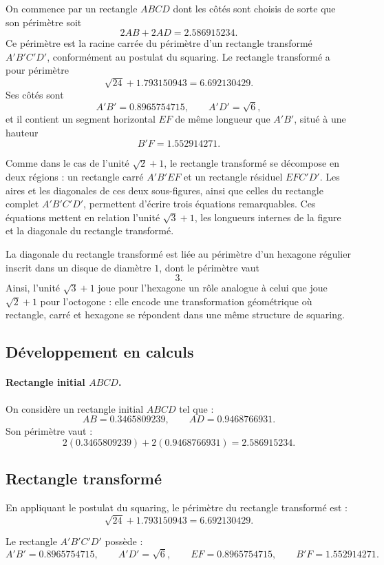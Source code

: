 \documentclass[12pt,a4paper]{article}
\begin{document}
On commence par un rectangle $ABCD$ dont les côtés sont choisis de sorte que son périmètre soit
\[
2AB + 2AD = 2.586915234.
\]
Ce périmètre est la racine carrée du périmètre d’un rectangle transformé $A'B'C'D'$, conformément au postulat du squaring. Le rectangle transformé a pour périmètre
\[
\sqrt{24} + 1.793150943 = 6.692130429.
\]
Ses côtés sont
\[
A'B' = 0.8965754715,
\qquad
A'D' = \sqrt{6},
\]
et il contient un segment horizontal $EF$ de même longueur que $A'B'$, situé à une hauteur
\[
B'F = 1.552914271.
\]

Comme dans le cas de l’unité $\sqrt{2}+1$, le rectangle transformé se décompose en deux régions : un rectangle carré $A'B'EF$ et un rectangle résiduel $EFC'D'$. Les aires et les diagonales de ces deux sous-figures, ainsi que celles du rectangle complet $A'B'C'D'$, permettent d’écrire trois équations remarquables. Ces équations mettent en relation l’unité $\sqrt{3}+1$, les longueurs internes de la figure et la diagonale du rectangle transformé.

La diagonale du rectangle transformé est liée au périmètre d’un hexagone régulier inscrit dans un disque de diamètre $1$, dont le périmètre vaut
\[
3.
\]
Ainsi, l’unité $\sqrt{3}+1$ joue pour l’hexagone un rôle analogue à celui que joue $\sqrt{2}+1$ pour l’octogone : elle encode une transformation géométrique où rectangle, carré et hexagone se répondent dans une même structure de squaring.

\subsection*{Développement en calculs}

\paragraph{Rectangle initial $ABCD$.}

On considère un rectangle initial $ABCD$ tel que :
\[
AB = 0.3465809239,
\qquad
AD = 0.9468766931.
\]
Son périmètre vaut :
\[
2(0.3465809239) + 2(0.9468766931)
= 2.586915234.
\]

\subsection{Rectangle transformé}

En appliquant le postulat du squaring, le périmètre du rectangle transformé est :
\[
\sqrt{24} + 1.793150943 = 6.692130429.
\]

Le rectangle $A'B'C'D'$ possède :
\[
A'B' = 0.8965754715, \qquad
A'D' = \sqrt{6}, \qquad
EF = 0.8965754715, \qquad
B'F = 1.552914271.
\]
\end{document}
